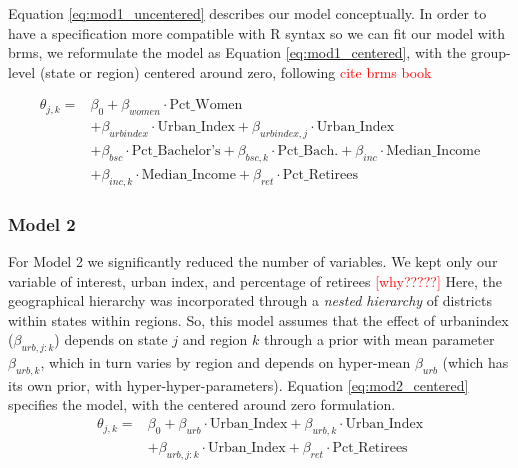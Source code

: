 \documentclass[12pt]{article}
\begin{document}
Equation \ref{eq:mod1_uncentered} describes our model conceptually. In order to have a specification more compatible with R syntax so we can fit our model with brms, we reformulate the model as Equation \ref{eq:mod1_centered}, with the group-level (state or region) centered around zero, following \textcolor{red}{cite brms book}




\begin{equation} \label{eq:mod1_centered}
	\begin{aligned}
		\theta_{j,k} = & \beta_0 + \beta_{women} \cdot \text{Pct\_Women}                                                                              \\
		               & + \beta_{urbindex} \cdot \text{Urban\_Index} + \beta_{urbindex, j} \cdot \text{Urban\_Index}                                 \\
		               & + \beta_{bsc} \cdot \text{Pct\_Bachelor's} + \beta_{bsc,k} \cdot \text{Pct\_Bach.} + \beta_{inc} \cdot \text{Median\_Income} \\
		               & + \beta_{inc,k} \cdot \text{Median\_Income} + \beta_{ret} \cdot \text{Pct\_Retirees}
	\end{aligned}
\end{equation}



\subsubsection*{Model 2} 

For Model 2 we significantly reduced the number of variables. We kept only our variable of interest, urban index, and percentage of retirees \textcolor{red}{[why?????]}
Here, the geographical hierarchy was incorporated through a \textit{nested hierarchy} of districts within states within regions.
So, this model assumes that the effect of urbanindex ($\beta_{urb, j:k}$) depends on state $j$ and region $k$ through a prior with mean parameter $\beta_{urb, k}$, which in turn varies by region and depends on hyper-mean $\beta_{urb}$ (which has its own prior, with hyper-hyper-parameters). Equation \ref{eq:mod2_centered} specifies the model, with the centered around zero formulation. 
\begin{equation} \label{eq:mod2_centered}
	\begin{aligned}
		\theta_{j,k} =    &\beta_0 + \beta_{urb} \cdot \text{Urban\_Index} + \beta_{urb,k} \cdot \text{Urban\_Index} \\
		&+ \beta_{urb,j:k} \cdot \text{Urban\_Index} + \beta_{ret} \cdot \text{Pct\_Retirees}
	\end{aligned}
\end{equation}
\end{document}
